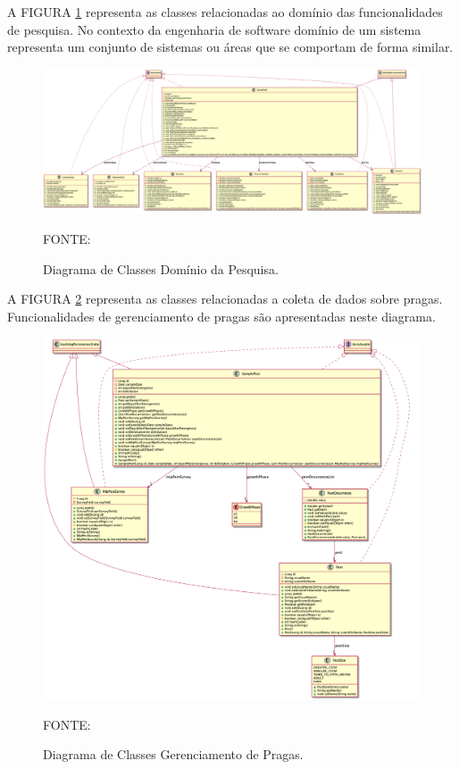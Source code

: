 \begin{landscape}
A FIGURA \ref{domain-survey} representa as classes relacionadas ao domínio das funcionalidades de pesquisa. No contexto da engenharia de software domínio de um sistema representa um conjunto de sistemas ou áreas que se comportam de forma similar.

\begin{figure}[h!]
	\includegraphics[scale=0.3]{dados/figuras/domain-survey-classes.png}
	\caption{Diagrama de Classes Domínio da Pesquisa.}
	FONTE: \cite[https:~//github.com/gabrielcostasilva/emater-mip-datacollection-app/tree/DDDLike/mip/src/main/resources/UMLDiagrams]{gabriel}
	\label{domain-survey}
\end{figure}
\end{landscape}



A FIGURA \ref{domain-pest} representa as classes relacionadas a coleta de dados sobre pragas. Funcionalidades de gerenciamento de pragas são apresentadas neste diagrama. 

\begin{figure}[h!]
	\centering
	\includegraphics[scale=0.35]{dados/figuras/domain-mip-classes.png}
	\caption{Diagrama de Classes Gerenciamento de Pragas.} 
	FONTE: \cite[https:~//github.com/gabrielcostasilva/emater-mip-datacollection-app/tree/DDDLike/mip/src/main/resources/UMLDiagrams]{gabriel}
	\label{domain-pest}
\end{figure}



